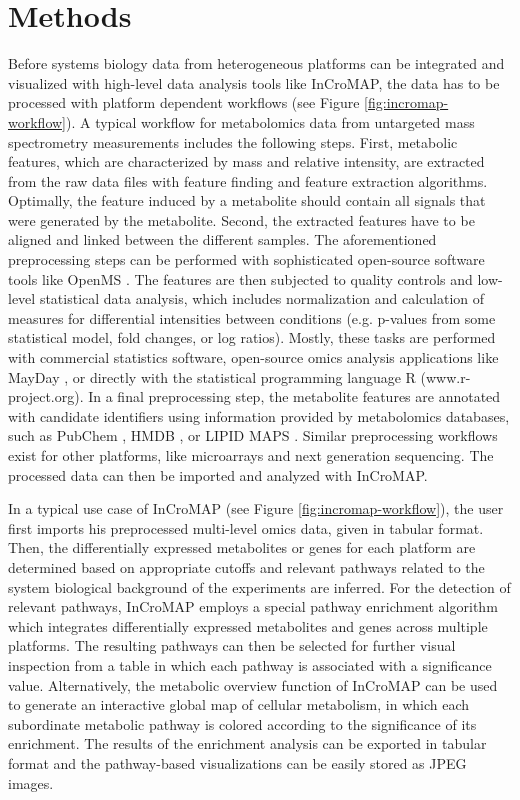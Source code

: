 \documentclass[final,5p,times,twocolumn]{elsarticle}
\begin{document}
\section{Methods}
Before systems biology data from heterogeneous platforms can be integrated and visualized with high-level data analysis tools like InCroMAP, the data has to be processed with platform dependent workflows (see Figure \ref{fig:incromap-workflow}). A typical workflow for metabolomics data from untargeted mass spectrometry measurements includes the following steps. First, metabolic features, which are characterized by mass and relative intensity, are extracted from the raw data files with feature finding and feature extraction algorithms. Optimally, the feature induced by a metabolite should contain all signals that were generated by the metabolite. Second, the extracted features have to be aligned and linked between the different samples. The aforementioned preprocessing steps can be performed with sophisticated open-source software tools like OpenMS \cite{Sturm2008}. The  features are then subjected to quality controls and low-level statistical data analysis, which includes normalization and calculation of measures for differential intensities between conditions (e.g. p-values from some statistical model, fold changes, or log ratios). Mostly, these tasks are performed with commercial statistics software, open-source omics analysis applications like MayDay \cite{Battke2010}, or directly with the statistical programming language R (www.r-project.org). In a final preprocessing step, the metabolite features are annotated with candidate identifiers using information provided by metabolomics databases, such as PubChem \cite{Wang2009}, HMDB \cite{Wishart2009}, or LIPID MAPS \cite{Sud2007}. Similar preprocessing workflows exist for other platforms, like microarrays and next generation sequencing. The processed data can then be imported and analyzed with InCroMAP.

In a typical use case of InCroMAP (see Figure \ref{fig:incromap-workflow}), the user first imports his preprocessed multi-level omics data, given in tabular format. Then, the differentially expressed metabolites or genes for each platform are determined based on appropriate cutoffs and relevant pathways related to the system biological background of the experiments are inferred. For the detection of relevant pathways, InCroMAP employs a special pathway enrichment algorithm which integrates differentially expressed metabolites and genes across multiple platforms. The resulting pathways can then be selected for further visual inspection from a table in which each pathway is associated with a significance value. Alternatively, the metabolic overview function of InCroMAP can be used to generate an interactive global map of cellular metabolism, in which each subordinate metabolic pathway is colored according to the significance of its enrichment. The results of the enrichment analysis can be exported in tabular format and the pathway-based visualizations can be easily stored as JPEG images.
\end{document}
